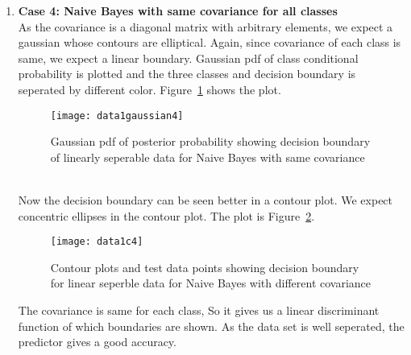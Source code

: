 \documentclass[11pt,paper=a4,answers]{exam}
\begin{document}
\begin{questions}
\begin{enumerate}[i.]
\begin{enumerate}
            \item \textbf{Case 4: Naive Bayes with same covariance for all classes}\\
            As the covariance is a diagonal matrix with arbitrary elements, we expect a gaussian whose contours are elliptical. Again, since covariance of each class is same, we expect a linear boundary. Gaussian pdf of class conditional probability is plotted and the three classes and decision boundary is seperated by different color. Figure~\ref{fig:data1g4} shows the plot.
            \begin{figure}[ht]
                \centering
                \texttt{[image: data1gaussian4]}
                \vspace{-30pt}
                \caption{Gaussian pdf of posterior probability showing decision boundary of linearly seperable data for Naive Bayes with same covariance}
                \label{fig:data1g4}
            \end{figure}\\
            Now the decision boundary can be seen better in a contour plot. We expect concentric ellipses in the contour plot. The plot is Figure~\ref{fig:data1c4}.
            \begin{figure}[ht]
                \centering
                \texttt{[image: data1c4]}
                \vspace{-30pt}
                \caption{Contour plots and test data points showing decision boundary for linear seperble data for Naive Bayes with different covariance}
                \label{fig:data1c4}
            \end{figure}
            The covariance is same for each class, So it gives us a linear discriminant function of which boundaries are shown. As the data set is well seperated, the predictor gives a good accuracy.


\end{enumerate}
\end{enumerate}
\end{questions}
\end{document}
